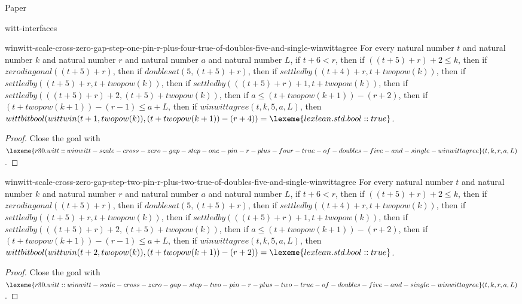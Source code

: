 \begin{lexlean}{Paper}
\begin{section}{witt-interfaces}
  \begin{theorem}{winwitt-scale-cross-zero-gap-step-one-pin-r-plus-four-true-of-doubles-five-and-single-winwittagree}
  For every natural number \(t\) and natural number \(k\) and natural number \(r\) and natural number \(a\) and natural number \(L\), if \(t + 6 < r\), then if \(((t + 5) + r) + 2 ≤ k\), then if \(zerodiagonal((t + 5) + r)\), then if \(doublesat(5, (t + 5) + r)\), then if \(settledby((t + 4) + r, t + twopow(k))\), then if \(settledby((t + 5) + r, t + twopow(k))\), then if \(settledby(((t + 5) + r) + 1, t + twopow(k))\), then if \(settledby(((t + 5) + r) + 2, (t + 5) + twopow(k))\), then if \(a ≤ (t + twopow(k + 1)) - (r + 2)\), then if \((t + twopow(k + 1)) - (r - 1) ≤ a + L\), then if \(winwittagree(t, k, 5, a, L)\), then \(wittbitbool(wittwin(t + 1, twopow(k)), (t + twopow(k + 1)) - (r + 4)) = \lexeme{lexlean.std.bool::true}\).
  \begin{proof}
  Close the goal with \(\lexeme{r30.witt::winwitt-scale-cross-zero-gap-step-one-pin-r-plus-four-true-of-doubles-five-and-single-winwittagree}(t, k, r, a, L)\).
  \end{proof}
  \end{theorem}

  \begin{theorem}{winwitt-scale-cross-zero-gap-step-two-pin-r-plus-two-true-of-doubles-five-and-single-winwittagree}
  For every natural number \(t\) and natural number \(k\) and natural number \(r\) and natural number \(a\) and natural number \(L\), if \(t + 6 < r\), then if \(((t + 5) + r) + 2 ≤ k\), then if \(zerodiagonal((t + 5) + r)\), then if \(doublesat(5, (t + 5) + r)\), then if \(settledby((t + 4) + r, t + twopow(k))\), then if \(settledby((t + 5) + r, t + twopow(k))\), then if \(settledby(((t + 5) + r) + 1, t + twopow(k))\), then if \(settledby(((t + 5) + r) + 2, (t + 5) + twopow(k))\), then if \(a ≤ (t + twopow(k + 1)) - (r + 2)\), then if \((t + twopow(k + 1)) - (r - 1) ≤ a + L\), then if \(winwittagree(t, k, 5, a, L)\), then \(wittbitbool(wittwin(t + 2, twopow(k)), (t + twopow(k + 1)) - (r + 2)) = \lexeme{lexlean.std.bool::true}\).
  \begin{proof}
  Close the goal with \(\lexeme{r30.witt::winwitt-scale-cross-zero-gap-step-two-pin-r-plus-two-true-of-doubles-five-and-single-winwittagree}(t, k, r, a, L)\).
  \end{proof}
  \end{theorem}


\end{section}
\end{lexlean}
